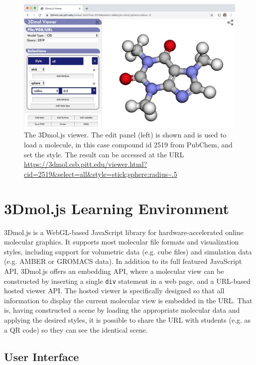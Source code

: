 \documentclass[journal=jceda8,manuscript=article]{achemso}
\begin{document}
\begin{figure}
    \centering
    \includegraphics[width=\linewidth]{viewer}
    \caption{The 3Dmol.js viewer.  The edit panel (left) is shown and is used to load a molecule, in this case compound id 2519 from PubChem, and set the style.  The result can be accessed at the URL \url{https://3dmol.csb.pitt.edu/viewer.html?cid=2519&select=all&style=stick;sphere:radius~.5}}
    \label{fig:viewer}
\end{figure}

\section{3Dmol.js Learning Environment}

3Dmol.js\cite{rego20153dmol} is a WebGL-based JavaScript library for hardware-accelerated online molecular graphics.  It supports most molecular file formats and visualization styles, including support for volumetric data (e.g. cube files) and simulation data (e.g. AMBER\cite{case2005amber} or GROMACS\cite{van2005gromacs} data).  In addition to its full featured JavaScript API, 3Dmol.js offers an embedding API, where a molecular view can be constructed by inserting a single \texttt{div} statement in a web page, and a URL-based hosted viewer API. The hosted viewer is specifically designed so that all information to display the current molecular view is embedded in the URL.  That is, having constructed a scene by loading the appropriate molecular data and applying the desired styles, it is possible to share the URL with students (e.g. as a QR code) so they can see the identical scene.

\subsection{User Interface}
\end{document}
